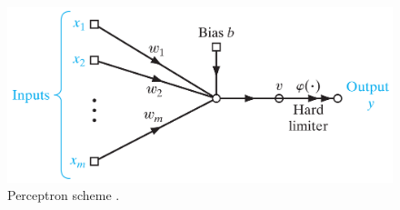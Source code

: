 \begin{figure}[!htb]
\centering
\includegraphics[width=.80\columnwidth]{images/064perceptron}
\caption[Perceptron scheme]{Perceptron scheme \cite{RefWorks:158}.}
\label{fig:064perceptron}
\end{figure}
